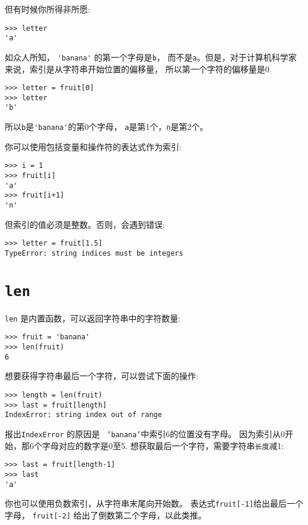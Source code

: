 \documentclass[10pt]{book}
\begin{document}
但有时候你所得非所愿:

\begin{verbatim}
>>> letter
'a'
\end{verbatim}
%
如众人所知， \verb"'banana'" 的第一个字母是{\tt b}，
而不是{\tt a}。但是，对于计算机科学家来说，索引是从字符串开始位置的偏移量，
所以第一个字符的偏移量是0.

\begin{verbatim}
>>> letter = fruit[0]
>>> letter
'b'
\end{verbatim}
%
所以{\tt b}是\verb"'banana'"的第0个字母， {\tt a}是第1个，{\tt n}是第2个。
 

你可以使用包括变量和操作符的表达式作为索引:

\begin{verbatim}
>>> i = 1
>>> fruit[i]
'a'
>>> fruit[i+1]
'n'
\end{verbatim}
%
但索引的值必须是整数。否则，会遇到错误:

\begin{verbatim}
>>> letter = fruit[1.5]
TypeError: string indices must be integers
\end{verbatim}
%

\section{{\tt len}}

{\tt len} 是内置函数，可以返回字符串中的字符数量:

\begin{verbatim}
>>> fruit = 'banana'
>>> len(fruit)
6
\end{verbatim}
%
想要获得字符串最后一个字符，可以尝试下面的操作:

\begin{verbatim}
>>> length = len(fruit)
>>> last = fruit[length]
IndexError: string index out of range
\end{verbatim}
%
报出{\tt IndexError} 的原因是 {\tt
'banana'}中索引6的位置没有字母。
因为索引从0开始，那6个字母对应的数字是0至5.
想获取最后一个字符，需要字符串{\tt 长度}减1:

\begin{verbatim}
>>> last = fruit[length-1]
>>> last
'a'
\end{verbatim}
%
你也可以使用负数索引，从字符串末尾向开始数。
表达式{\tt fruit[-1]}给出最后一个字母，
{\tt fruit[-2]} 给出了倒数第二个字母，以此类推。
\end{document}
